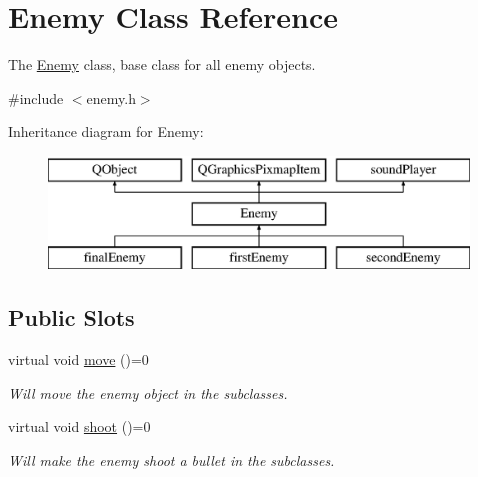 \hypertarget{classEnemy}{}\section{Enemy Class Reference}
\label{classEnemy}


The \hyperlink{classEnemy}{Enemy} class, base class for all enemy objects.  




{\ttfamily \#include $<$enemy.\+h$>$}

Inheritance diagram for Enemy\+:\begin{figure}[H]
\begin{center}
\leavevmode
\includegraphics[height=3.000000cm]{classEnemy}
\end{center}
\end{figure}
\subsection*{Public Slots}
\begin{DoxyCompactItemize}
\item 
\mbox{\label{classEnemy_a1c208ac4a80b892f9692222bcb96f6ae}} 
virtual void \hyperlink{classEnemy_a1c208ac4a80b892f9692222bcb96f6ae}{move} ()=0
\begin{DoxyCompactList}\small\item\em Will move the enemy object in the subclasses. \end{DoxyCompactList}\item 
\mbox{\label{classEnemy_a3208d68423cd0c79d5f2528ebb849dc5}} 
virtual void \hyperlink{classEnemy_a3208d68423cd0c79d5f2528ebb849dc5}{shoot} ()=0
\begin{DoxyCompactList}\small\item\em Will make the enemy shoot a bullet in the subclasses. \end{DoxyCompactList}\end{DoxyCompactItemize}
